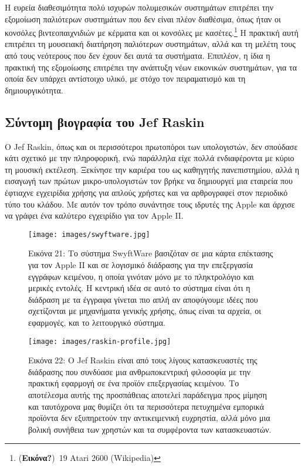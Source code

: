 \documentclass[
]{article}
\begin{document}
Η ευρεία διαθεσιμότητα πολύ ισχυρών πολυμεσικών συστημάτων επιτρέπει την
εξομοίωση παλιότερων συστημάτων που δεν είναι πλέον διαθέσιμα, όπως ήταν
οι κονσόλες βιντεοπαιχνιδιών με κέρματα και οι κονσόλες με
κασέτες.\footnote{(\textbf{Εικόνα?})~19 Atari 2600 (Wikipedia)} Η
πρακτική αυτή επιτρέπει τη μουσειακή διατήρηση παλιότερων συστημάτων,
αλλά και τη μελέτη τους από τους νεότερους που δεν έχουν δει αυτά τα
συστήματα. Επιπλέον, η ίδια η πρακτική της εξομοίωσης επιτρέπει την
ανάπτυξη νέων εικονικών συστημάτων, για τα οποία δεν υπάρχει αντίστοιχο
υλικό, με στόχο τον πειραματισμό και τη δημιουργικότητα.

\hypertarget{ux3c3ux3cdux3bdux3c4ux3bfux3bcux3b7-ux3b2ux3b9ux3bfux3b3ux3c1ux3b1ux3c6ux3afux3b1-ux3c4ux3bfux3c5-jef-raskin}{%
\subsection{Σύντομη βιογραφία του Jef
Raskin}\label{ux3c3ux3cdux3bdux3c4ux3bfux3bcux3b7-ux3b2ux3b9ux3bfux3b3ux3c1ux3b1ux3c6ux3afux3b1-ux3c4ux3bfux3c5-jef-raskin}}

Ο Jef Raskin, όπως και οι περισσότεροι πρωτοπόροι των υπολογιστών, δεν
σπούδασε κάτι σχετικό με την πληροφορική, ενώ παράλληλα είχε πολλά
ενδιαφέροντα με κύριο τη μουσική εκτέλεση. Ξεκίνησε την καριέρα του ως
καθηγητής πανεπιστημίου, αλλά η εισαγωγή των πρώτων μικρο-υπολογιστών
τον βρήκε να δημιουργεί μια εταιρεία που έφτιαχνε εγχειρίδια χρήσης για
απλούς χρήστες και να αρθρογραφεί στον περιοδικό τύπο του κλάδου. Με
αυτόν τον τρόπο συνάντησε τους ιδρυτές της Apple και άρχισε να γράφει
ένα καλύτερο εγχειρίδιο για τον Apple II.

\leavevmode{}%
\begin{figure}
\hypertarget{fig:swyftware}{%
\centering
\texttt{[image: images/swyftware.jpg]}
\caption{Εικόνα 21: Το σύστημα SwyftWare βασιζόταν σε μια κάρτα
επέκτασης για τον Apple II και σε λογισμικό διάδρασης για την
επεξεργασία εγγράφων κειμένου, η οποία γινόταν μόνο με το πληκτρολόγιο
και μερικές εντολές. Η κεντρική ιδέα σε αυτό το σύστημα είναι ότι η
διάδραση με τα έγγραφα γίνεται πιο απλή αν αποφύγουμε ιδέες που
σχετίζονται με μηχανήματα γενικής χρήσης, όπως είναι τα αρχεία, οι
εφαρμογές, και το λειτουργικό σύστημα.}\label{fig:swyftware}
}
\end{figure}

\leavevmode{}%
\begin{figure}
\hypertarget{fig:raskin-profile}{%
\centering
\texttt{[image: images/raskin-profile.jpg]}
\caption{Εικόνα 22: Ο Jef Raskin είναι από τους λίγους κατασκευαστές της
διάδρασης που συνδύασε μια ανθρωποκεντρική φιλοσοφία με την πρακτική
εφαρμογή σε ένα προϊόν επεξεργασίας κειμένου. Το αποτέλεσμα αυτής της
προσπάθειας αποτελεί παράδειγμα προς μίμηση και ταυτόχρονα μας θυμίζει
ότι τα περισσότερα πετυχημένα εμπορικά προϊόντα δεν εξυπηρετούν την
αντικειμενική ευχρηστία, αλλά μόνο μια βολική συνήθεια των χρηστών και
τα συμφέροντα των κατασκευαστών.}\label{fig:raskin-profile}
}
\end{figure}
\end{document}
